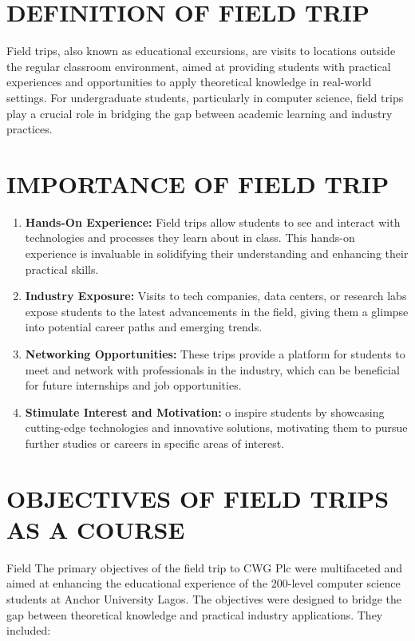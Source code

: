 \documentclass[a4paper,12pt]{report}
\begin{document}
\section[Definition]{DEFINITION OF FIELD TRIP}
Field trips, also known as educational excursions, are visits to locations outside the regular classroom environment, aimed at providing students with practical experiences and opportunities to apply theoretical knowledge in real-world settings. For undergraduate students, particularly in computer science, field trips play a crucial role in bridging the gap between academic learning and industry practices.

\section[Importance]{IMPORTANCE OF FIELD TRIP}
\begin{enumerate}
    \item \textbf{Hands-On Experience:} Field trips allow students to see and interact with technologies and processes they learn about in class. This hands-on experience is invaluable in solidifying their understanding and enhancing their practical skills.
    \item \textbf{Industry Exposure:} Visits to tech companies, data centers, or research labs expose students to the latest advancements in the field, giving them a glimpse into potential career paths and emerging trends.
    \item \textbf{Networking Opportunities:} These trips provide a platform for students to meet and network with professionals in the industry, which can be beneficial for future internships and job opportunities.
    \item \textbf{Stimulate Interest and Motivation:} o inspire students by showcasing cutting-edge technologies and innovative solutions, motivating them to pursue further studies or careers in specific areas of interest.
\end{enumerate}

\section[Objectives]{OBJECTIVES OF FIELD TRIPS AS A COURSE}
Field The primary objectives of the field trip to CWG Plc were multifaceted and aimed at enhancing the educational experience of the 200-level computer science students at Anchor University Lagos. The objectives were designed to bridge the gap between theoretical knowledge and practical industry applications. They included:
\end{document}
